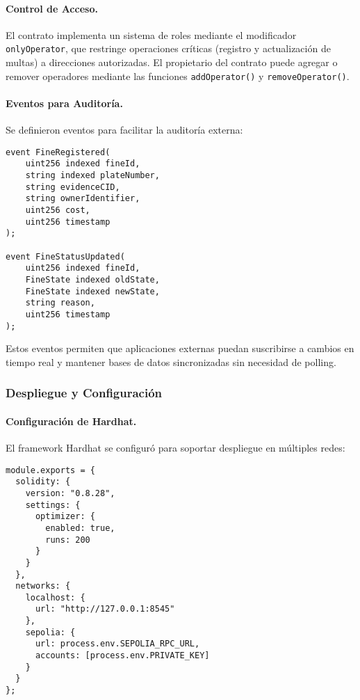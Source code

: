 \paragraph{Control de Acceso.}
El contrato implementa un sistema de roles mediante el modificador \texttt{onlyOperator}, que restringe operaciones críticas (registro y actualización de multas) a direcciones autorizadas. El propietario del contrato puede agregar o remover operadores mediante las funciones \texttt{addOperator()} y \texttt{removeOperator()}.

\paragraph{Eventos para Auditoría.}
Se definieron eventos para facilitar la auditoría externa:

\begin{verbatim}
event FineRegistered(
    uint256 indexed fineId,
    string indexed plateNumber,
    string evidenceCID,
    string ownerIdentifier,
    uint256 cost,
    uint256 timestamp
);

event FineStatusUpdated(
    uint256 indexed fineId,
    FineState indexed oldState,
    FineState indexed newState,
    string reason,
    uint256 timestamp
);
\end{verbatim}

Estos eventos permiten que aplicaciones externas puedan suscribirse a cambios en tiempo real y mantener bases de datos sincronizadas sin necesidad de polling.

\subsubsection{Despliegue y Configuración}

\paragraph{Configuración de Hardhat.}
El framework Hardhat se configuró para soportar despliegue en múltiples redes:

\begin{verbatim}
module.exports = {
  solidity: {
    version: "0.8.28",
    settings: {
      optimizer: {
        enabled: true,
        runs: 200
      }
    }
  },
  networks: {
    localhost: {
      url: "http://127.0.0.1:8545"
    },
    sepolia: {
      url: process.env.SEPOLIA_RPC_URL,
      accounts: [process.env.PRIVATE_KEY]
    }
  }
};
\end{verbatim}

